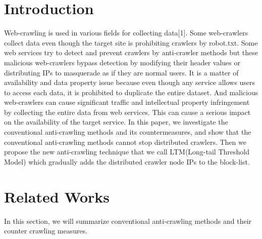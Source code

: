 \documentclass[sigconf,anonymous=true]{acmart}
\begin{document}

\maketitle


%
%
\section{Introduction}
Web-crawling is used in various fields for collecting data[1]. Some web-crawlers collect data even though the target site is prohibiting crawlers by robot.txt. Some web services try to detect and prevent crawlers by anti-crawler methods but these malicious web-crawlers bypass detection by modifying their header values or distributing IPs to masquerade as if they are normal users.
It is a matter of availability and data property issue because even though any service allows users to access each data, it is prohibited to duplicate the entire dataset. And malicious web-crawlers can cause significant traffic and intellectual property infringement by collecting the entire data from web services. This can cause a serious impact on the availability of the target service.
In this paper, we investigate the conventional anti-crawling methods and its countermeasures, and show that the conventional anti-crawling methods cannot stop distributed crawlers. Then we propose the new anti-crawling technique that we call LTM(Long-tail Threshold Model) which gradually adds the distributed crawler node IPs to the block-list.

%
%
\section{Related Works}
In this section, we will summarize conventional anti-crawling methods and their counter crawling measures.
\end{document}
